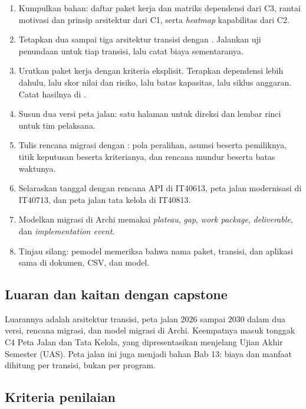 \begin{enumerate}
  \item Kumpulkan bahan: daftar paket kerja dan matriks dependensi dari C3,
        rantai motivasi dan prinsip arsitektur dari C1, serta
        \textit{heatmap} kapabilitas dari C2.
  \item Tetapkan dua sampai tiga arsitektur transisi dengan
        . Jalankan uji
        penundaan untuk tiap transisi, lalu catat biaya sementaranya.
  \item Urutkan paket kerja dengan kriteria eksplisit. Terapkan dependensi
        lebih dahulu, lalu skor nilai dan risiko, lalu batas kapasitas, lalu
        siklus anggaran. Catat hasilnya di
        .
  \item Susun dua versi peta jalan: satu halaman untuk direksi dan lembar rinci
        untuk tim pelaksana.
  \item Tulis rencana migrasi dengan
        : pola peralihan,
        asumsi beserta pemiliknya, titik keputusan beserta kriterianya, dan
        rencana mundur beserta batas waktunya.
  \item Selaraskan tanggal dengan rencana API di IT40613, peta jalan
        modernisasi di IT40713, dan peta jalan tata kelola di IT40813.
  \item Modelkan migrasi di Archi memakai \textit{plateau}, \textit{gap},
        \textit{work package}, \textit{deliverable}, dan \textit{implementation
        event}.
  \item Tinjau silang: pemodel memeriksa bahwa nama paket, transisi, dan
        aplikasi sama di dokumen, CSV, dan model.
\end{enumerate}

\subsection*{Luaran dan kaitan dengan capstone}

Luarannya adalah arsitektur transisi, peta jalan 2026 sampai 2030 dalam dua
versi, rencana migrasi, dan model migrasi di Archi. Keempatnya masuk tonggak C4
Peta Jalan dan Tata Kelola, yang dipresentasikan menjelang Ujian Akhir Semester
(UAS). Peta jalan ini juga menjadi bahan Bab 13: biaya dan manfaat dihitung per
transisi, bukan per program.

\subsection*{Kriteria penilaian}

